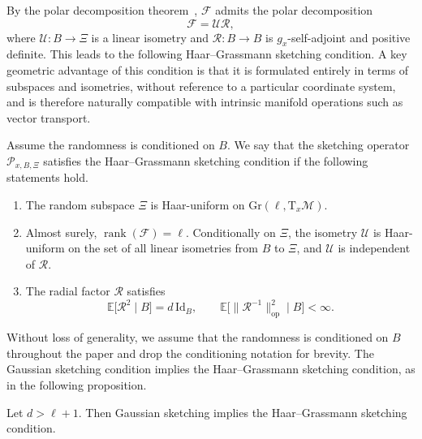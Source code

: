 \documentclass[final,onefignum,onetabnum]{siamart250211}
\begin{document}
By the polar decomposition theorem~\cite{higham2008functions}, $\mathcal F$ admits the polar decomposition
\[
\mathcal F=\mathcal U\mathcal R,
\]
where $\mathcal U:B\to \Xi$ is a linear isometry and $\mathcal R:B\to B$ is $g_x$-self-adjoint and positive definite. This leads to the following Haar--Grassmann sketching condition. A key geometric advantage of this condition is that it is formulated entirely in terms of subspaces and isometries, without reference to a particular coordinate system, and is therefore naturally compatible with intrinsic manifold operations such as vector transport.

  
\begin{definition}
  \label{def:haar-grassmann-sketch}
  Assume the randomness is conditioned on $B$. 
  We say that the sketching operator $\mathcal{P}_{x, B, \Xi}$ satisfies the Haar--Grassmann sketching condition if the following statements hold.
\begin{enumerate}[label=\textup{(\roman*)}, ref=\textup{(\roman*)}]
\item \label{itm:haar-grassmann-sketch-haar}
The random subspace $\Xi$ is Haar-uniform on $\mathrm{Gr}(\ell,\mathrm T_x\mathcal M)$.

\item \label{itm:haar-grassmann-sketch-polar}
Almost surely, $\operatorname{rank}(\mathcal F)=\ell$.
Conditionally on $\Xi$, the isometry $\mathcal U$ is Haar-uniform on the set of all linear isometries from $B$ to $\Xi$, and $\mathcal U$ is independent of $\mathcal R$.

\item \label{itm:haar-grassmann-sketch-moment}
The radial factor $\mathcal R$ satisfies
\[
\mathbb E\big[\mathcal R^2 \mid B\big]=d\,\mathrm{Id}_B,
\qquad
\mathbb E\big[\|\mathcal R^{-1}\|_{\mathrm{op}}^2 \mid B\big]<\infty.
\]
\end{enumerate}
\end{definition}


Without loss of generality, we assume that the randomness is conditioned on $B$ throughout the paper and drop the conditioning notation for brevity.
The Gaussian sketching condition implies the Haar--Grassmann sketching condition, as in the following proposition.

\begin{proposition}
  \label{prop:gaussian-implies-haar-grassmann}
  Let $d > \ell + 1$. Then Gaussian sketching implies the Haar--Grassmann sketching condition.
\end{proposition}
\end{document}

